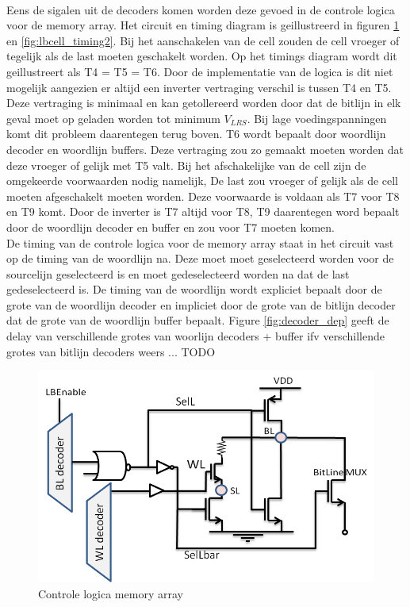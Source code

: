 \paragraph{}
Eens de sigalen uit de decoders komen worden deze gevoed in de controle logica voor de memory array. Het circuit en timing diagram is geillustreerd in figuren \ref{fig:lbcell_timing1} en \ref{fig:lbcell_timing2}. Bij het aanschakelen van de cell zouden de cell vroeger of tegelijk als de last moeten geschakelt worden. Op het timings diagram wordt dit geillustreert als T4 = T5 = T6. Door de implementatie van de logica is dit niet mogelijk aangezien er altijd een inverter vertraging verschil is tussen T4 en T5. Deze vertraging is minimaal en kan getollereerd worden door dat de bitlijn in elk geval moet op geladen worden tot minimum $V_{LRS}$. Bij lage voedingspanningen komt dit probleem daarentegen terug boven. T6 wordt bepaalt door woordlijn decoder en woordlijn buffers. Deze vertraging zou zo gemaakt moeten worden dat deze vroeger of gelijk met T5 valt. Bij het afschakelijke van de cell zijn de omgekeerde voorwaarden nodig namelijk, De last zou vroeger of gelijk als de cell moeten afgeschakelt moeten worden. Deze voorwaarde is voldaan als T7 voor T8 en T9 komt. Door de inverter is T7 altijd voor T8, T9 daarentegen word bepaalt door de woordlijn decoder en buffer en zou voor T7 moeten komen. \\
De timing van de controle logica voor de memory array staat in het circuit vast op de timing van de woordlijn na. Deze moet moet geselecteerd worden voor de sourcelijn geselecteerd is en moet gedeselecteerd worden na dat de last gedeselecteerd is. De timing van de woordlijn wordt expliciet bepaalt door de grote van de woordlijn decoder en impliciet door de grote van de bitlijn decoder dat de grote van de woordlijn buffer bepaalt. Figure \ref{fig:decoder_dep} geeft de delay van verschillende grotes van woorlijn decoders + buffer ifv verschillende grotes van bitlijn decoders weers ... TODO

\begin{figure}[!ht]
  \centering
  \includegraphics[scale=0.6]{../fig/hfdstk-timing-lbcell1.png}
  \caption{Controle logica memory array}
  \label{fig:lbcell_timing1}
\end{figure}

